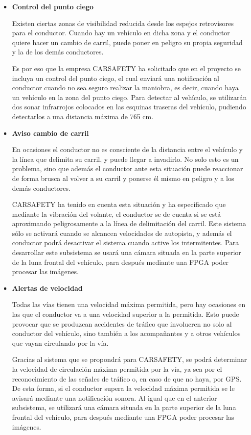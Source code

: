 \begin{itemize}[-]
\item \textbf{Control del punto ciego}
\par Existen ciertas zonas de visibilidad reducida desde los espejos retrovisores para el conductor. Cuando hay un vehículo en dicha zona y el conductor quiere hacer un cambio de carril, puede poner en peligro su propia seguridad y la de los demás conductores.
\par Es por eso que la empresa CARSAFETY ha solicitado que en el proyecto se incluya un control del punto ciego, el cual enviará una notificación al conductor cuando no sea seguro realizar la maniobra, es decir, cuando haya un vehículo en la zona del punto ciego. Para detectar al vehículo, se utilizarán dos sonar infrarrojos colocados en las esquinas traseras del vehículo, pudiendo detectarlos a una distancia máxima de 765 cm.
\item \textbf{Aviso cambio de carril}
\par En ocasiones el conductor no es consciente de la distancia entre el vehículo y la línea que delimita su carril, y puede llegar a invadirlo. No solo esto es un problema, sino que además el conductor ante esta situación puede reaccionar de forma brusca al volver a su carril y ponerse él mismo en peligro y a los demás conductores.
\par CARSAFETY ha tenido en cuenta esta situación y ha especificado que mediante la vibración del volante, el conductor se de cuenta si se está aproximando peligrosamente a la línea de delimitación del carril. Este sistema sólo se activará cuando se alcancen velocidades de autopista, y además el conductor podrá desactivar el sistema cuando active los intermitentes. Para desarrollar este subsistema se usará una cámara situada en la parte superior de la luna frontal del vehículo, para después mediante una FPGA poder procesar las imágenes.
\item \textbf{Alertas de velocidad}
\par Todas las vías tienen una velocidad máxima permitida, pero hay ocasiones en las que el conductor va a una velocidad superior a la permitida. Esto puede provocar que se produzcan accidentes de tráfico que involucren no solo al conductor del vehículo, sino también a los acompañantes y a otros vehículos que vayan circulando por la vía.
\par Gracias al sistema que se propondrá para CARSAFETY, se podrá determinar la velocidad de circulación máxima permitida por la vía, ya sea por el reconocimiento de las señales de tráfico o, en caso de que no haya, por GPS. De esta forma, si el conductor supera la velocidad máxima permitida se le avisará mediante una notificación sonora. Al igual que en el anterior subsistema, se utilizará una cámara situada en la parte superior de la luna frontal del vehículo, para después mediante una FPGA poder procesar las imágenes.

\end{itemize}

